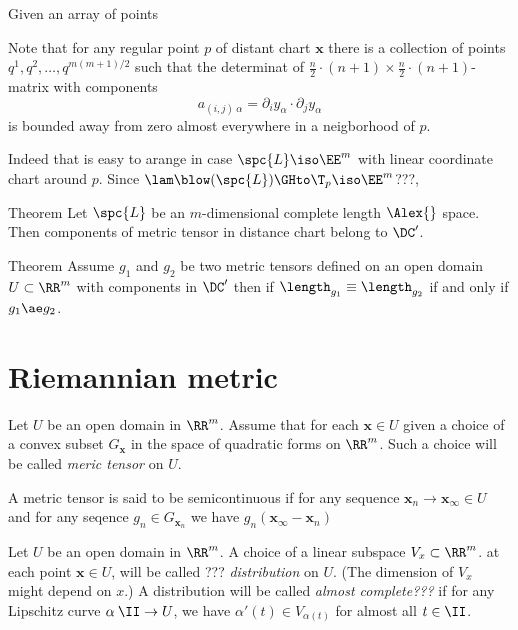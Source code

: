 Given an array of points 

Note that for any regular point $p$ of distant chart $\bm{x}$ there is a collection of points $q^1,q^2,\dots,q^{m(m+1)/2}$ such that the determinat of $\tfrac{n}{2}\cdot(n+1)\times\tfrac{n}{2}\cdot(n+1) $-matrix with components
\[a_{(i,j)\ \alpha}=\partial_iy_\alpha\cdot\partial_jy_\alpha\]
is bounded away from zero almost everywhere in a neigborhood of $p$.

Indeed that is easy to arange in case $\spc{L}\iso\EE^m$ with linear coordinate chart around $p$.
Since $\lam\blow(\spc{L})\GHto\T_p\iso\EE^m$???,

\begin{thm}{Theorem}
Let $\spc{L}$ be an $m$-dimensional complete length $\Alex{}$ space.
Then components of metric tensor in distance chart belong to $\DC'$.
\end{thm}

\begin{thm}{Theorem}
Assume $g_1$ and $g_2$ be two metric tensors defined on an open domain $U\subset\RR^m$ with components in $\DC'$
 then if $\length_{g_1}\equiv\length_{g_2}$ if and only if $g_1\ae g_2$. 
\end{thm}












\section{Riemannian metric}

Let $U$ be an open domain in $\RR^m$.
Assume that for each $\bm{x}\in U$ given a choice of a convex subset $G_{\bm{x}}$ in the space of quadratic forms on $\RR^m$.
Such a choice will be called \emph{meric tensor} on $U$.

A metric tensor is said to be semicontinuous if for any sequence $\bm{x}_n\to\bm{x}_\infty\in U$ and for any seqence $g_n\in G_{\bm{x}_n}$ we have 
$g_n(\bm{x}_\infty-\bm{x}_n)$



Let  $U$ be an open domain in $\RR^m$.
A choice of a linear subspace $V_x\subset \RR^m$.
at each point $\bm{x}\in U$, will be called ??? \emph{distribution} on $U$.
(The dimension of $V_x$ might depend on $x$.)
A distribution will be called \emph{almost complete???}
if for any Lipschitz curve $\alpha\:\II\to U$,
we have $\alpha'(t)\in V_{\alpha(t)}$ for almost all $t\in\II$.

